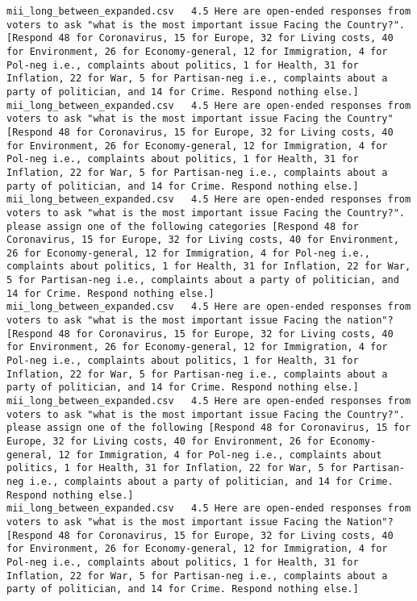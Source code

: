 \begin{lstlisting}[label=lst:promptvariants]
mii_long_between_expanded.csv	4.5	Here are open-ended responses from voters to ask "what is the most important issue Facing the Country?". [Respond 48 for Coronavirus, 15 for Europe, 32 for Living costs, 40 for Environment, 26 for Economy-general, 12 for Immigration, 4 for Pol-neg i.e., complaints about politics, 1 for Health, 31 for Inflation, 22 for War, 5 for Partisan-neg i.e., complaints about a party of politician, and 14 for Crime. Respond nothing else.]
mii_long_between_expanded.csv	4.5	Here are open-ended responses from voters to ask "what is the most important issue Facing the Country" [Respond 48 for Coronavirus, 15 for Europe, 32 for Living costs, 40 for Environment, 26 for Economy-general, 12 for Immigration, 4 for Pol-neg i.e., complaints about politics, 1 for Health, 31 for Inflation, 22 for War, 5 for Partisan-neg i.e., complaints about a party of politician, and 14 for Crime. Respond nothing else.]
mii_long_between_expanded.csv	4.5	Here are open-ended responses from voters to ask "what is the most important issue Facing the Country?". please assign one of the following categories [Respond 48 for Coronavirus, 15 for Europe, 32 for Living costs, 40 for Environment, 26 for Economy-general, 12 for Immigration, 4 for Pol-neg i.e., complaints about politics, 1 for Health, 31 for Inflation, 22 for War, 5 for Partisan-neg i.e., complaints about a party of politician, and 14 for Crime. Respond nothing else.]
mii_long_between_expanded.csv	4.5	Here are open-ended responses from voters to ask "what is the most important issue Facing the nation"? [Respond 48 for Coronavirus, 15 for Europe, 32 for Living costs, 40 for Environment, 26 for Economy-general, 12 for Immigration, 4 for Pol-neg i.e., complaints about politics, 1 for Health, 31 for Inflation, 22 for War, 5 for Partisan-neg i.e., complaints about a party of politician, and 14 for Crime. Respond nothing else.]
mii_long_between_expanded.csv	4.5	Here are open-ended responses from voters to ask "what is the most important issue Facing the Country?". please assign one of the following [Respond 48 for Coronavirus, 15 for Europe, 32 for Living costs, 40 for Environment, 26 for Economy-general, 12 for Immigration, 4 for Pol-neg i.e., complaints about politics, 1 for Health, 31 for Inflation, 22 for War, 5 for Partisan-neg i.e., complaints about a party of politician, and 14 for Crime. Respond nothing else.]
mii_long_between_expanded.csv	4.5	Here are open-ended responses from voters to ask "what is the most important issue Facing the Nation"? [Respond 48 for Coronavirus, 15 for Europe, 32 for Living costs, 40 for Environment, 26 for Economy-general, 12 for Immigration, 4 for Pol-neg i.e., complaints about politics, 1 for Health, 31 for Inflation, 22 for War, 5 for Partisan-neg i.e., complaints about a party of politician, and 14 for Crime. Respond nothing else.]

\end{lstlisting}
